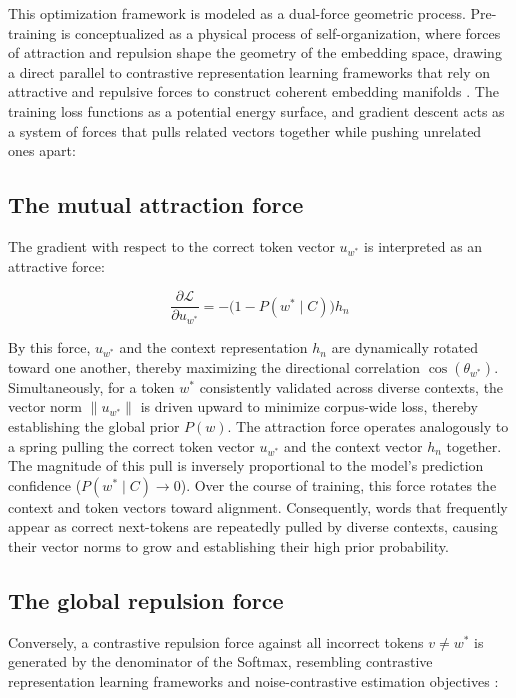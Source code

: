 \documentclass[11pt,a4paper]{article}
\begin{document}
	This optimization framework is modeled as a dual-force geometric process. Pre-training is conceptualized as a physical process of self-organization, where forces of attraction and repulsion shape the geometry of the embedding space, drawing a direct parallel to contrastive representation learning frameworks that rely on attractive and repulsive forces to construct coherent embedding manifolds \citep{hadsell2006dimensionality}. The training loss functions as a potential energy surface, and gradient descent acts as a system of forces that pulls related vectors together while pushing unrelated ones apart:
	
	\subsection{The mutual attraction force}
	The gradient with respect to the correct token vector $u_{w^*}$ is interpreted as an attractive force:
	
	\begin{equation}
		\frac{\partial \mathcal{L}}{\partial u_{w^*}} = -\big(1 - P(w^* \mid C)\big) h_n
	\end{equation}
	
	By this force, $u_{w^*}$ and the context representation $h_n$ are dynamically rotated toward one another, thereby maximizing the directional correlation $\cos(\theta_{w^*})$. Simultaneously, for a token $w^*$ consistently validated across diverse contexts, the vector norm $\|u_{w^*}\|$ is driven upward to minimize corpus-wide loss, thereby establishing the global prior $P(w)$. The attraction force operates analogously to a spring pulling the correct token vector $u_{w^*}$ and the context vector $h_n$ together. The magnitude of this pull is inversely proportional to the model's prediction confidence ($P(w^* \mid C) \to 0$). Over the course of training, this force rotates the context and token vectors toward alignment. Consequently, words that frequently appear as correct next-tokens are repeatedly pulled by diverse contexts, causing their vector norms to grow and establishing their high prior probability.
	
	\subsection{The global repulsion force}
	Conversely, a contrastive repulsion force against all incorrect tokens $v \neq w^*$ is generated by the denominator of the Softmax, resembling contrastive representation learning frameworks \citep{oord2018representation} and noise-contrastive estimation objectives \citep{gutmann2010noise}:
	
\end{document}
